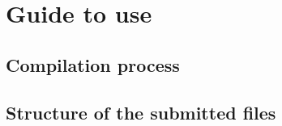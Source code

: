 \section{Guide to use}
\subsection{Compilation process}
\subsection{Structure of the submitted files}